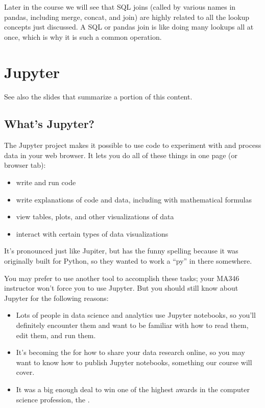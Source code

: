 \documentclass[letterpaper,10pt,english]{sphinxmanual}
\begin{document}
Later in the course we will see that SQL joins (called by various names in pandas, including merge, concat, and join) are highly related to all the lookup concepts just discussed.  A SQL or pandas join is like doing many lookups all at once, which is why it is such a common operation.


\chapter{Jupyter}
\label{\detokenize{chapter-3-jupyter:jupyter}}\label{\detokenize{chapter-3-jupyter::doc}}
See also the slides that summarize a portion of this content.


\section{What’s Jupyter?}
\label{\detokenize{chapter-3-jupyter:what-s-jupyter}}
The Jupyter project makes it possible to use code to experiment with and process data in your web browser.  It lets you do all of these things in one page (or browser tab):
\begin{itemize}
\item {} 
write and run code

\item {} 
write explanations of code and data, including with mathematical formulas

\item {} 
view tables, plots, and other visualizations of data

\item {} 
interact with certain types of data visualizations

\end{itemize}

It’s pronounced just like Jupiter, but has the funny spelling because it was originally built for Python, so they wanted to work a “py” in there somewhere.

You may prefer to use another tool to accomplish these tasks; your MA346 instructor won’t force you to use Jupyter.  But you should still know about Jupyter for the following reasons:
\begin{itemize}
\item {} 
Lots of people in data science and analytics use Jupyter notebooks, so you’ll definitely encounter them and want to be familiar with how to read them, edit them, and run them.

\item {} 
It’s becoming the  for how to share your data research online, so you may want to know how to publish Jupyter notebooks, something our course will cover.

\item {} 
It was a big enough deal to win one of the highest awards in the computer science profession, the .

\end{itemize}
\end{document}
